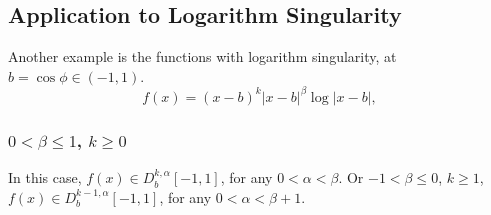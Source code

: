 \documentclass[11pt]{article}
\begin{document}
\subsection{Application to Logarithm Singularity}\label{logarithm_function} Another example is the functions with logarithm singularity, at $b = \cos \phi \in (-1,1)$.
\begin{equation}
    f(x) = (x-b)^k |x-b|^\beta\log|x-b|,
\end{equation}
\subsubsection{$0<\beta\leq 1$, $k \geq 0$} In this case, $f(x) \in D_b^{k,\alpha}[-1,1]$, for any $0<\alpha<\beta$. \newline Or $-1<\beta\leq 0$, $k\geq 1$, $f(x) \in D_b^{k-1,\alpha}[-1,1]$, for any $0<\alpha<\beta+1$.
\end{document}
